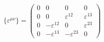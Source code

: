 \begin{equation}
\{\varepsilon^{\mu\nu}\} = \left( \begin{array} {cccc}
0 & 0 & 0 & 0 \\
0 &  0        &   \varepsilon^{12}      &  \varepsilon^{13}  \\
0 &     -\varepsilon^{12}     &     0    &  \varepsilon^{23}  \\
0 &   -\varepsilon^{13}      &  -\varepsilon^{23}       &  0 \end{array} \right)
\label{n14}
\end{equation}


